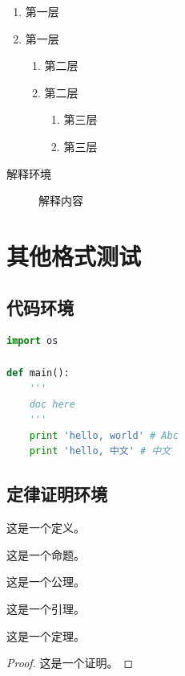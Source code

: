 \documentclass[format=draft,degree=bachelor]{hustthesis}
\begin{document}
\begin{enumerate}
    \item 第一层
    \item 第一层
    \begin{enumerate}
        \item 第二层
        \item 第二层
        \begin{enumerate}
            \item 第三层
            \item 第三层
        \end{enumerate}
    \end{enumerate}
\end{enumerate}

\begin{description}
    \item[解释环境]  解释内容
\end{description}

\chapter{其他格式测试}

\section{代码环境}

\begin{lstlisting}[language=python]
import os

def main():
    '''
    doc here
    '''
    print 'hello, world' # Abc
    print 'hello, 中文' # 中文
\end{lstlisting}

\section{定律证明环境}

\begin{definition}
这是一个定义。
\end{definition}
\begin{proposition}
这是一个命题。
\end{proposition}
\begin{axiom}
这是一个公理。
\end{axiom}
\begin{lemma}
这是一个引理。
\end{lemma}
\begin{theorem}
这是一个定理。
\end{theorem}
\begin{proof}
这是一个证明。
\end{proof}
\end{document}
